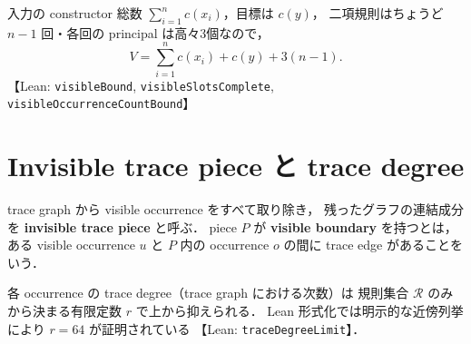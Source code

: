 \documentclass[paper=a4,fontsize=10pt,jafontscale=0.92]{jlreq}
\theoremstyle{plain}
\theoremstyle{definition}
\theoremstyle{remark}
\newcommand{\R}{\mathcal{R}}
\newcommand{\lean}[1]{\texttt{#1}}
\begin{document}
入力の constructor 総数 $\sum_{i=1}^{n}c(x_i)$，目標は $c(y)$，
二項規則はちょうど $n-1$ 回・各回の principal は高々3個なので，
\[
  V = \sum_{i=1}^{n}c(x_i) + c(y) + 3(n-1).
\]
【Lean: \lean{visibleBound}, \lean{visibleSlotsComplete},
\lean{visibleOccurrenceCountBound}】

\section{Invisible trace piece と trace degree}
\label{sec:piece}

trace graph から visible occurrence をすべて取り除き，
残ったグラフの連結成分を \textbf{invisible trace piece} と呼ぶ．
piece $P$ が \textbf{visible boundary} を持つとは，
ある visible occurrence $u$ と $P$ 内の occurrence $o$ の間に
trace edge があることをいう．

各 occurrence の trace degree（trace graph における次数）は
規則集合 $\R$ のみから決まる有限定数 $r$ で上から抑えられる．
Lean 形式化では明示的な近傍列挙により $r = 64$ が証明されている
【Lean: \lean{traceDegreeLimit}】．
\end{document}
